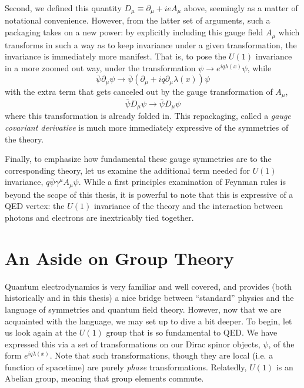 Second, we defined this quantity $D_{\mu} \equiv \partial_{\mu} + ieA_{\mu}$ above, seemingly as a matter 
of notational convenience. However, from the latter set of arguments, such a packaging takes on a new power: 
by explicitly including this gauge field $A_{\mu}$ which transforms in such a way as to keep invariance 
under a given transformation, the invariance is immediately more manifest. That is, to pose the $U(1)$ 
invariance in a more zoomed out way, under the transformation $\psi\rightarrow e^{iq\lambda(x)}\psi$,
while
\begin{equation}
\bar{\psi}\partial_{\mu}\psi \rightarrow \bar{\psi}(\partial_{\mu}+iq\partial_{\mu}\lambda(x))\psi
\end{equation}
with the extra term that gets canceled out by the gauge transformation of $A_{\mu}$,
\begin{equation}
\bar{\psi}D_{\mu}\psi \rightarrow \bar{\psi}D_{\mu}\psi
\end{equation}
where this transformation is already folded in. This repackaging, called a \emph{gauge covariant derivative} 
is much more immediately expressive of the symmetries of the theory.

Finally, to emphasize how fundamental these gauge symmetries are to the corresponding theory, let us examine
the additional term needed for $U(1)$ invariance, $q\bar{\psi}\gamma^{\mu}A_{\mu}\psi$. While a first principles
examination of Feynman rules is beyond the scope of this thesis, it is powerful to note that this is expressive 
of a QED vertex: the $U(1)$ invariance of the theory and the interaction between photons and electrons are 
inextricably tied together.

\section{An Aside on Group Theory}
Quantum electrodynamics is very familiar and well covered, and provides (both historically and in this thesis) 
a nice bridge between ``standard'' physics and the language of symmetries and quantum field theory. However, now 
that we are acquainted with the language, we may set up to dive a bit deeper. To begin, let us look again at the $U(1)$ 
group that is so fundamental to QED. We have expressed this via a set of transformations on our Dirac spinor objects, 
$\psi$, of the form $e^{iq\lambda(x)}$. Note that such transformations, though they are local (i.e. a function of 
spacetime) are purely \emph{phase} transformations. Relatedly, $U(1)$ is an Abelian group, meaning that 
group elements commute.

